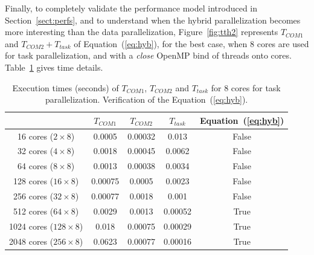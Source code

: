 Finally, to completely validate the performance model introduced in Section~\ref{sect:perfs}, and to understand when the hybrid parallelization becomes more interesting than the data parallelization, Figure~\ref{fig:tth2} represents $T_{COM1}$ and $T_{COM2}+T_{task}$ of Equation~(\ref{eq:hyb}), for the best case, \ie when 8 cores are used for task parallelization, and with a \emph{close} OpenMP bind of threads onto cores. Table~\ref{fig:tth} gives time details.

\begin{table}[!h]
 \begin{center}
 \begin{tabular}{|c|c|c|c|c|}
    \hline 
    & $T_{COM1}$ & $T_{COM2}$ & $T_{task}$ & Equation~(\ref{eq:hyb})\\
   \hline
   16 cores ($2 \times 8$) & 0.0005 & 0.00032 & 0.013 & False\\
   32 cores ($4 \times 8$) & 0.0018 & 0.00045 & 0.0062 & False\\
   64 cores ($8 \times 8$) & 0.0013 & 0.00038 & 0.0034 & False\\
   128 cores ($16 \times 8$) & 0.00075 & 0.0005 & 0.0023 & False\\
   256 cores ($32 \times 8$) & 0.00077 & 0.0018 & 0.001 & False\\
   512 cores ($64 \times 8$) & 0.0029 & 0.0013 & 0.00052 & True\\
   1024 cores ($128 \times 8$) & 0.018 & 0.00075 & 0.00029 & True\\
   2048 cores ($256 \times 8$) & 0.0623 & 0.00077 & 0.00016 & True\\
   \hline
 \end{tabular}
\caption{Execution times (seconds) of $T_{COM1}$, $T_{COM2}$ and $T_{task}$ for 8 cores for task parallelization. Verification of the Equation~(\ref{eq:hyb}).}
\label{fig:tth}
 \end{center}
\end{table}

